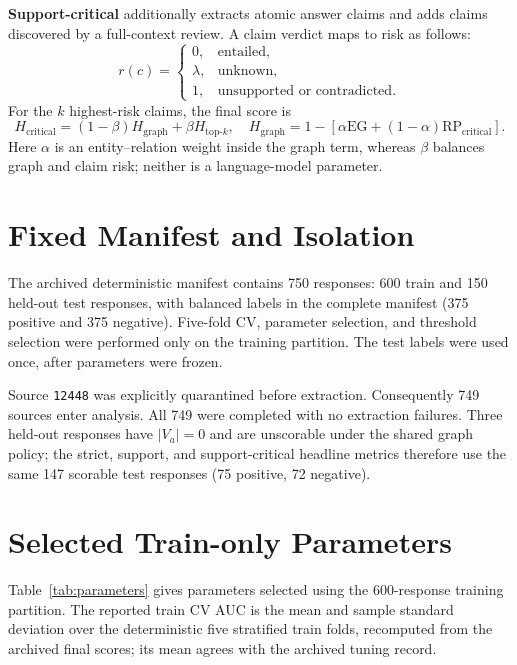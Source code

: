 \documentclass[11pt,a4paper]{article}
\newcommand{\EG}{\mathrm{EG}}
\newcommand{\RP}{\mathrm{RP}}
\newcommand{\Hc}{H_{\mathrm{critical}}}
\newcommand{\Htop}{H_{\mathrm{top}\text{-}k}}
\begin{document}
\textbf{Support-critical} additionally extracts atomic answer claims and adds claims discovered by a full-context review.  A claim verdict maps to risk as follows:
\begin{equation}
r(c)=
\begin{cases}
0, & \text{entailed},\\
\lambda, & \text{unknown},\\
1, & \text{unsupported or contradicted}.
\end{cases}
\end{equation}
For the $k$ highest-risk claims, the final score is
\begin{equation}
\Hc=(1-\beta)H_{\mathrm{graph}}+\beta\Htop,
\quad
H_{\mathrm{graph}}=1-[\alpha\EG+(1-\alpha)\RP_{\mathrm{critical}}].
\end{equation}
Here $\alpha$ is an entity--relation weight inside the graph term, whereas $\beta$ balances graph and claim risk; neither is a language-model parameter.

\section{Fixed Manifest and Isolation}
The archived deterministic manifest contains 750 responses: 600 train and 150 held-out test responses, with balanced labels in the complete manifest (375 positive and 375 negative).  Five-fold CV, parameter selection, and threshold selection were performed only on the training partition.  The test labels were used once, after parameters were frozen.

Source \texttt{12448} was explicitly quarantined before extraction.  Consequently 749 sources enter analysis.  All 749 were completed with no extraction failures.  Three held-out responses have $|V_a|=0$ and are unscorable under the shared graph policy; the strict, support, and support-critical headline metrics therefore use the same 147 scorable test responses (75 positive, 72 negative).

\section{Selected Train-only Parameters}
Table~\ref{tab:parameters} gives parameters selected using the 600-response training partition.  The reported train CV AUC is the mean and sample standard deviation over the deterministic five stratified train folds, recomputed from the archived final scores; its mean agrees with the archived tuning record.
\end{document}
